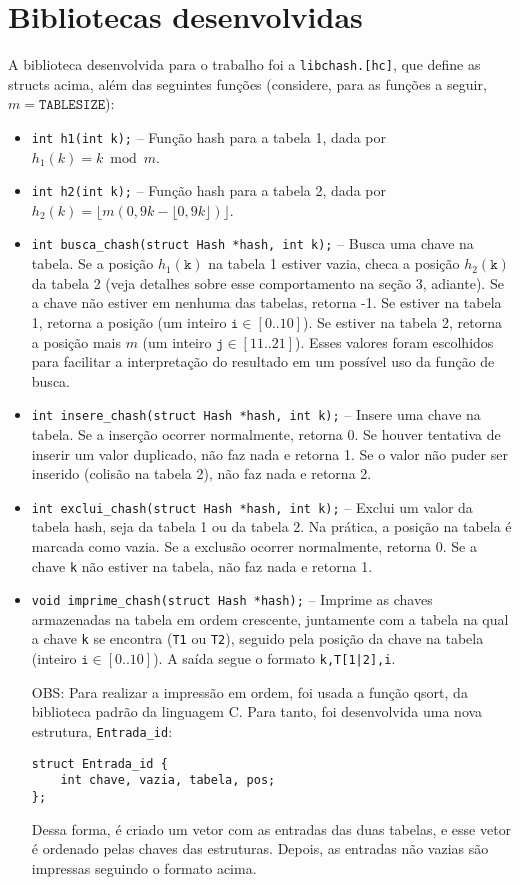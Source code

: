 \documentclass[a4paper, 11pt]{article}
\begin{document}
\section{Bibliotecas desenvolvidas}
A biblioteca desenvolvida para o trabalho foi a \texttt{libchash.[hc]}, que define as
structs acima, além das seguintes funções (considere, para as funções a seguir,
$m = \texttt{TABLESIZE}$):
\begin{itemize}
    \item \texttt{int h1(int k);} -- Função hash para a tabela 1, dada por
        $h_1(k) = k \bmod m$.
    \item \texttt{int h2(int k);} -- Função hash para a tabela 2, dada por 
        $h_2(k) = \lfloor m(0,9k - \lfloor 0,9k \rfloor) \rfloor$.
    \item \texttt{int busca\_chash(struct Hash *hash, int k);} -- Busca uma chave na
        tabela. Se a posição $h_1(\texttt{k})$ na tabela 1 estiver vazia, checa a
        posição $h_2(\texttt{k})$ da tabela 2 (veja detalhes sobre esse comportamento
        na seção 3, adiante). Se a chave não estiver em nenhuma das tabelas, retorna
        -1. Se estiver na tabela 1, retorna a posição (um inteiro $\texttt{i} \in
        [0..10]$). Se estiver na tabela 2, retorna a posição mais $m$ (um inteiro
        $\texttt{j} \in [11..21]$). Esses valores foram escolhidos para facilitar a
        interpretação do resultado em um possível uso da função de busca.
    \item \texttt{int insere\_chash(struct Hash *hash, int k);} -- Insere uma chave na
        tabela. Se a inserção ocorrer normalmente, retorna 0. Se houver tentativa de
        inserir um valor duplicado, não faz nada e retorna 1. Se o valor não puder ser
        inserido (colisão na tabela 2), não faz nada e retorna 2.
    \item \texttt{int exclui\_chash(struct Hash *hash, int k);} -- Exclui um valor da
        tabela hash, seja da tabela 1 ou da tabela 2. Na prática, a posição na tabela é
        marcada como vazia. Se a exclusão ocorrer normalmente, retorna 0. Se a chave
        \texttt{k} não estiver na tabela, não faz nada e retorna 1.
    \item \texttt{void imprime\_chash(struct Hash *hash);} -- Imprime as chaves
        armazenadas na tabela em ordem crescente, juntamente com a tabela na qual a
        chave \texttt{k} se encontra (\texttt{T1} ou \texttt{T2}), seguido pela posição
        da chave na tabela (inteiro $\texttt{i} \in [0..10]$). A saída segue o formato
        \texttt{k,T[1|2],i}.

        OBS: Para realizar a impressão em ordem, foi usada a função qsort, da biblioteca
        padrão da linguagem C. Para tanto, foi desenvolvida uma nova estrutura,
        \texttt{Entrada\_id}:
        \begin{verbatim}
struct Entrada_id {
    int chave, vazia, tabela, pos;
};
        \end{verbatim}
        Dessa forma, é criado um vetor com as entradas das duas tabelas, e esse
        vetor é ordenado pelas chaves das estruturas. Depois, as entradas não vazias
        são impressas seguindo o formato acima.
\end{itemize}
\end{document}
